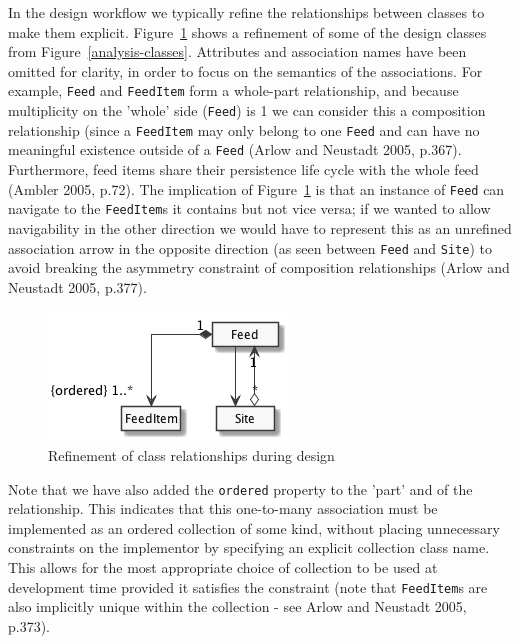 \documentclass{article}
\begin{document}
In the design workflow we typically refine the relationships between classes to make them explicit. Figure~\ref{design-classes} shows a refinement of some of the design classes from Figure~\ref{analysis-classes}. Attributes and association names have been omitted for clarity, in order to focus on the semantics of the associations. For example, \texttt{Feed} and \texttt{FeedItem} form a whole-part relationship, and because multiplicity on the 'whole' side (\texttt{Feed}) is 1 we can consider this a composition relationship (since a \texttt{FeedItem} may only belong to one \texttt{Feed} and can have no meaningful existence outside of a \texttt{Feed} (Arlow and Neustadt 2005, p.367). Furthermore, feed items share their persistence life cycle with the whole feed (Ambler 2005, p.72). The implication of Figure~\ref{design-classes} is that an instance of \texttt{Feed} can navigate to the \texttt{FeedItem}s it contains but not vice versa; if we wanted to allow navigability in the other direction we would have to represent this as an unrefined association arrow in the opposite direction (as seen between \texttt{Feed} and \texttt{Site}) to avoid breaking the asymmetry constraint of composition relationships (Arlow and Neustadt 2005, p.377).

\begin{figure}
  \begin{center}
    \includegraphics[width=\textwidth]{design-classes.png}
  \end{center}
  \label{design-classes}
  \caption{Refinement of class relationships during design}
\end{figure}

Note that we have also added the \texttt{ordered} property to the 'part' and of the relationship. This indicates that this one-to-many association must be implemented as an ordered collection of some kind, without placing unnecessary constraints on the implementor by specifying an explicit collection class name. This allows for the most appropriate choice of collection to be used at development time provided it satisfies the constraint (note that \texttt{FeedItem}s are also implicitly unique within the collection - see Arlow and Neustadt 2005, p.373).
\end{document}
